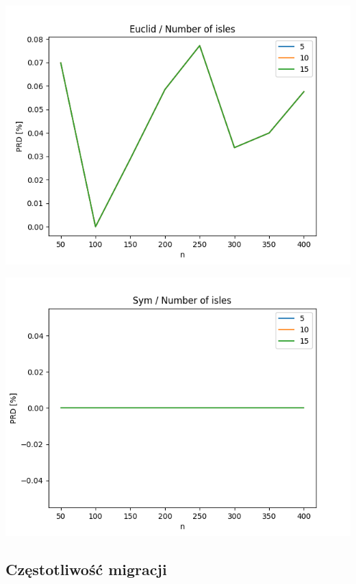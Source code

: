 \documentclass{article}
\begin{document}
\begin{center}
\includegraphics[width=\textwidth, 
                   height = 0.4\textheight, 
                   keepaspectratio]
                  {plots/euclid_10_isles} 
\end{center}

\begin{center}
\includegraphics[width=\textwidth, 
                   height = 0.4\textheight, 
                   keepaspectratio]
                  {plots/sym_10_isles} 
\end{center}


\subsection{Częstotliwość migracji}
\end{document}
